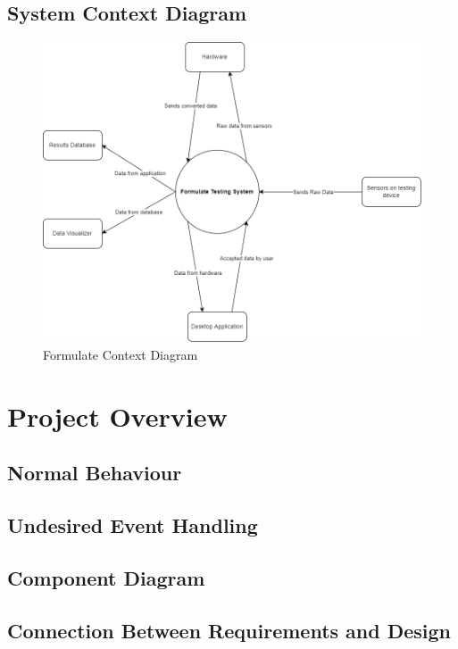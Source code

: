 \documentclass[12pt, titlepage]{article}
\begin{document}
\subsection{System Context Diagram}
\begin{figure}[h!]
  \begin{center}
  \includegraphics[width=1.1\textwidth]{sys_context_diagram}
  \caption{Formulate Context Diagram}
  \end{center}
  \end{figure}
  \newpage

\section{Project Overview}

\subsection{Normal Behaviour}

\subsection{Undesired Event Handling}


\subsection{Component Diagram}

\subsection{Connection Between Requirements and Design} \label{SecConnection}
\end{document}
